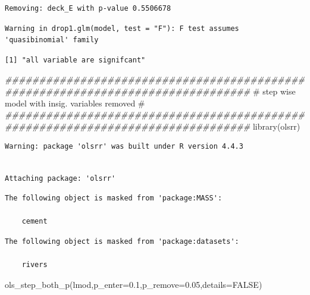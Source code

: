\documentclass[
  letterpaper,
  DIV=11,
  numbers=noendperiod]{scrartcl}
\newenvironment{Shaded}{\begin{snugshade}}{\end{snugshade}}
\newcommand{\AttributeTok}[1]{\textcolor[rgb]{0.40,0.45,0.13}{#1}}
\newcommand{\CommentTok}[1]{\textcolor[rgb]{0.37,0.37,0.37}{#1}}
\newcommand{\ConstantTok}[1]{\textcolor[rgb]{0.56,0.35,0.01}{#1}}
\newcommand{\DocumentationTok}[1]{\textcolor[rgb]{0.37,0.37,0.37}{\textit{#1}}}
\newcommand{\FloatTok}[1]{\textcolor[rgb]{0.68,0.00,0.00}{#1}}
\newcommand{\FunctionTok}[1]{\textcolor[rgb]{0.28,0.35,0.67}{#1}}
\newcommand{\NormalTok}[1]{\textcolor[rgb]{0.00,0.23,0.31}{#1}}
\begin{document}
\begin{verbatim}
Removing: deck_E with p-value 0.5506678 
\end{verbatim}

\begin{verbatim}
Warning in drop1.glm(model, test = "F"): F test assumes 'quasibinomial' family
\end{verbatim}

\begin{verbatim}
[1] "all variable are signifcant"
\end{verbatim}

\begin{Shaded}
\begin{Highlighting}[]
\DocumentationTok{\#\#\#\#\#\#\#\#\#\#\#\#\#\#\#\#\#\#\#\#\#\#\#\#\#\#\#\#\#\#\#\#\#\#\#\#\#\#\#\#\#\#\#\#\#\#\#\#\#\#\#\#\#\#\#\#\#\#\#\#\#\#\#\#\#\#\#\#\#\#\#\#\#\#\#\#\#\#\#\#}
\CommentTok{\#                step wise model with insig. variables removed                 \# }
\DocumentationTok{\#\#\#\#\#\#\#\#\#\#\#\#\#\#\#\#\#\#\#\#\#\#\#\#\#\#\#\#\#\#\#\#\#\#\#\#\#\#\#\#\#\#\#\#\#\#\#\#\#\#\#\#\#\#\#\#\#\#\#\#\#\#\#\#\#\#\#\#\#\#\#\#\#\#\#\#\#\#\#\#}
\FunctionTok{library}\NormalTok{(olsrr)}
\end{Highlighting}
\end{Shaded}

\begin{verbatim}
Warning: package 'olsrr' was built under R version 4.4.3
\end{verbatim}

\begin{verbatim}

Attaching package: 'olsrr'
\end{verbatim}

\begin{verbatim}
The following object is masked from 'package:MASS':

    cement
\end{verbatim}

\begin{verbatim}
The following object is masked from 'package:datasets':

    rivers
\end{verbatim}

\begin{Shaded}
\begin{Highlighting}[]
\FunctionTok{ols\_step\_both\_p}\NormalTok{(lmod,}\AttributeTok{p\_enter=}\FloatTok{0.1}\NormalTok{,}\AttributeTok{p\_remove=}\FloatTok{0.05}\NormalTok{,}\AttributeTok{details=}\ConstantTok{FALSE}\NormalTok{)}
\end{Highlighting}
\end{Shaded}
\end{document}
